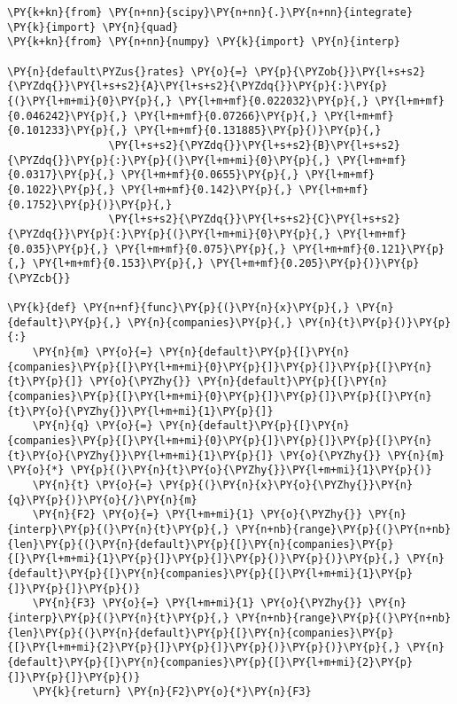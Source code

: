 \begin{tcolorbox}[breakable, size=fbox, boxrule=1pt, pad at break*=1mm,colback=cellbackground, colframe=cellborder]
\begin{Verbatim}[commandchars=\\\{\}]
\PY{k+kn}{from} \PY{n+nn}{scipy}\PY{n+nn}{.}\PY{n+nn}{integrate} \PY{k}{import} \PY{n}{quad}
\PY{k+kn}{from} \PY{n+nn}{numpy} \PY{k}{import} \PY{n}{interp}
	
\PY{n}{default\PYZus{}rates} \PY{o}{=} \PY{p}{\PYZob{}}\PY{l+s+s2}{\PYZdq{}}\PY{l+s+s2}{A}\PY{l+s+s2}{\PYZdq{}}\PY{p}{:}\PY{p}{(}\PY{l+m+mi}{0}\PY{p}{,} \PY{l+m+mf}{0.022032}\PY{p}{,} \PY{l+m+mf}{0.046242}\PY{p}{,} \PY{l+m+mf}{0.07266}\PY{p}{,} \PY{l+m+mf}{0.101233}\PY{p}{,} \PY{l+m+mf}{0.131885}\PY{p}{)}\PY{p}{,}
                \PY{l+s+s2}{\PYZdq{}}\PY{l+s+s2}{B}\PY{l+s+s2}{\PYZdq{}}\PY{p}{:}\PY{p}{(}\PY{l+m+mi}{0}\PY{p}{,} \PY{l+m+mf}{0.0317}\PY{p}{,} \PY{l+m+mf}{0.0655}\PY{p}{,} \PY{l+m+mf}{0.1022}\PY{p}{,} \PY{l+m+mf}{0.142}\PY{p}{,} \PY{l+m+mf}{0.1752}\PY{p}{)}\PY{p}{,}
                \PY{l+s+s2}{\PYZdq{}}\PY{l+s+s2}{C}\PY{l+s+s2}{\PYZdq{}}\PY{p}{:}\PY{p}{(}\PY{l+m+mi}{0}\PY{p}{,} \PY{l+m+mf}{0.035}\PY{p}{,} \PY{l+m+mf}{0.075}\PY{p}{,} \PY{l+m+mf}{0.121}\PY{p}{,} \PY{l+m+mf}{0.153}\PY{p}{,} \PY{l+m+mf}{0.205}\PY{p}{)}\PY{p}{\PYZcb{}}
	
\PY{k}{def} \PY{n+nf}{func}\PY{p}{(}\PY{n}{x}\PY{p}{,} \PY{n}{default}\PY{p}{,} \PY{n}{companies}\PY{p}{,} \PY{n}{t}\PY{p}{)}\PY{p}{:}
    \PY{n}{m} \PY{o}{=} \PY{n}{default}\PY{p}{[}\PY{n}{companies}\PY{p}{[}\PY{l+m+mi}{0}\PY{p}{]}\PY{p}{]}\PY{p}{[}\PY{n}{t}\PY{p}{]} \PY{o}{\PYZhy{}} \PY{n}{default}\PY{p}{[}\PY{n}{companies}\PY{p}{[}\PY{l+m+mi}{0}\PY{p}{]}\PY{p}{]}\PY{p}{[}\PY{n}{t}\PY{o}{\PYZhy{}}\PY{l+m+mi}{1}\PY{p}{]}
    \PY{n}{q} \PY{o}{=} \PY{n}{default}\PY{p}{[}\PY{n}{companies}\PY{p}{[}\PY{l+m+mi}{0}\PY{p}{]}\PY{p}{]}\PY{p}{[}\PY{n}{t}\PY{o}{\PYZhy{}}\PY{l+m+mi}{1}\PY{p}{]} \PY{o}{\PYZhy{}} \PY{n}{m} \PY{o}{*} \PY{p}{(}\PY{n}{t}\PY{o}{\PYZhy{}}\PY{l+m+mi}{1}\PY{p}{)}
    \PY{n}{t} \PY{o}{=} \PY{p}{(}\PY{n}{x}\PY{o}{\PYZhy{}}\PY{n}{q}\PY{p}{)}\PY{o}{/}\PY{n}{m}
    \PY{n}{F2} \PY{o}{=} \PY{l+m+mi}{1} \PY{o}{\PYZhy{}} \PY{n}{interp}\PY{p}{(}\PY{n}{t}\PY{p}{,} \PY{n+nb}{range}\PY{p}{(}\PY{n+nb}{len}\PY{p}{(}\PY{n}{default}\PY{p}{[}\PY{n}{companies}\PY{p}{[}\PY{l+m+mi}{1}\PY{p}{]}\PY{p}{]}\PY{p}{)}\PY{p}{)}\PY{p}{,} \PY{n}{default}\PY{p}{[}\PY{n}{companies}\PY{p}{[}\PY{l+m+mi}{1}\PY{p}{]}\PY{p}{]}\PY{p}{)}
    \PY{n}{F3} \PY{o}{=} \PY{l+m+mi}{1} \PY{o}{\PYZhy{}} \PY{n}{interp}\PY{p}{(}\PY{n}{t}\PY{p}{,} \PY{n+nb}{range}\PY{p}{(}\PY{n+nb}{len}\PY{p}{(}\PY{n}{default}\PY{p}{[}\PY{n}{companies}\PY{p}{[}\PY{l+m+mi}{2}\PY{p}{]}\PY{p}{]}\PY{p}{)}\PY{p}{)}\PY{p}{,} \PY{n}{default}\PY{p}{[}\PY{n}{companies}\PY{p}{[}\PY{l+m+mi}{2}\PY{p}{]}\PY{p}{]}\PY{p}{)}
    \PY{k}{return} \PY{n}{F2}\PY{o}{*}\PY{n}{F3}
	

\end{Verbatim}
\end{tcolorbox}
